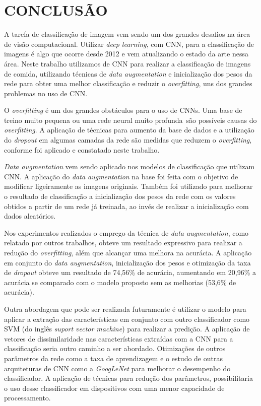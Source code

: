 
\chapter{CONCLUSÃO}
\label{chap:conclusao}

A tarefa de classificação de imagem vem sendo um dos grandes desafios na área de visão computacional. Utilizar \textit{deep learning}, com CNN, para a classificação de imagens é algo que ocorre desde 2012 e vem atualizando o estado da arte nessa área. Neste trabalho utilizamos de CNN para realizar a classificação de imagens de comida, utilizando técnicas de \textit{data augmentation} e inicialização dos pesos da rede para obter uma melhor classificação e reduzir o \textit{overfitting}, uns dos grandes problemas no uso de CNN.
\par O \textit{overfitting} é um dos grandes obstáculos para o uso de CNNs. Uma base de treino muito pequena ou uma rede neural muito profunda~são possíveis causas do \textit{overfitting}. A aplicação de técnicas para aumento da base de dados e a utilização do \textit{dropout} em algumas camadas da rede são medidas que reduzem o \textit{overfitting}, conforme foi aplicado e constatado neste trabalho.
\par \textit{Data augmentation} vem sendo aplicado nos modelos de classificação que utilizam CNN. A aplicação do \textit{data augmentation} na base foi feita com o objetivo de modificar ligeiramente as imagens originais. Também foi utilizado para melhorar o resultado de classificação a inicialização dos pesos da rede com os valores obtidos a partir de um rede já treinada, ao invés de realizar a inicialização com dados aleatórios.   
\par Nos experimentos realizados o emprego da técnica de \textit{data augmentation}, como relatado por outros trabalhos, obteve um resultado expressivo para realizar a redução do \textit{overfitting}, além que alcançar uma melhora na acurácia. A aplicação em conjunto do \textit{data augmentation}, inicialização dos pesos e otimização da taxa de \textit{dropout} obteve um resultado de 74,56\% de acurácia, aumentando em 20,96\% a acurácia se comparado com o modelo proposto sem as melhorias (53,6\% de acurácia).
\par Outra abordagem que pode ser realizada futuramente é utilizar o modelo para aplicar a extração das características em conjunto com outro classificador como SVM (do inglês \textit{suport vector machine}) para realizar a predição. A aplicação de vetores de dissimilaridade nas características extraídas com a CNN para a classificação seria outro caminho a ser abordado. Otimizações de outros parâmetros da rede como a taxa de aprendizagem e o estudo de outras arquiteturas de CNN como a \textit{GoogLeNet} \cite{szegedy2015going} para melhorar o desempenho do classificador. A aplicação de técnicas para redução dos parâmetros, possibilitaria o uso desse classificador em dispositivos com uma menor capacidade de processamento.